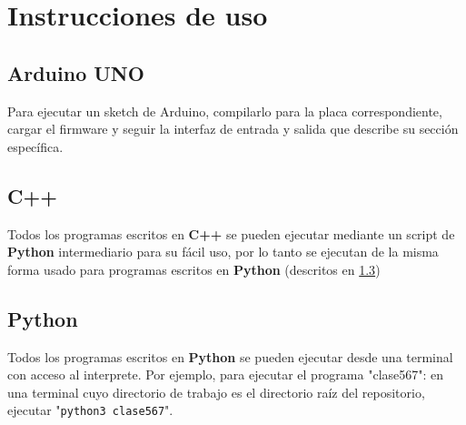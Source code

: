 %
\section{Instrucciones de uso}

\subsection{Arduino UNO}
\label{src:genericinstrc:arduino}

Para ejecutar un sketch de Arduino, compilarlo para la placa correspondiente,
cargar el firmware y seguir la interfaz de entrada y salida que describe su
sección específica.

\subsection{C++}
\label{src:genericinstrc:cplusplus}

Todos los programas escritos en \textbf{C++} se pueden ejecutar mediante un script de \textbf{Python} intermediario para su fácil uso, por lo tanto se ejecutan de la misma forma usado para programas escritos en \textbf{Python} (descritos en \ref{src:genericinstrc:python})

\subsection{Python}
\label{src:genericinstrc:python}

Todos los programas escritos en \textbf{Python} se pueden ejecutar desde una terminal con acceso al interprete. Por ejemplo, para ejecutar el programa "clase567": en una terminal cuyo directorio de trabajo es el directorio raíz del repositorio, ejecutar "\texttt{python3 clase567}".